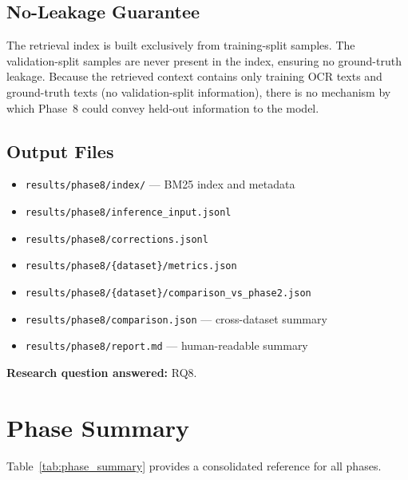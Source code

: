 \subsection{No-Leakage Guarantee}

The retrieval index is built exclusively from training-split samples. The
validation-split samples are never present in the index, ensuring no
ground-truth leakage. Because the retrieved context contains only training
OCR texts and ground-truth texts (no validation-split information), there is
no mechanism by which Phase~8 could convey held-out information to the model.

\subsection{Output Files}
\begin{itemize}
  \item \texttt{results/phase8/index/} --- BM25 index and metadata
  \item \texttt{results/phase8/inference\_input.jsonl}
  \item \texttt{results/phase8/corrections.jsonl}
  \item \texttt{results/phase8/\{dataset\}/metrics.json}
  \item \texttt{results/phase8/\{dataset\}/comparison\_vs\_phase2.json}
  \item \texttt{results/phase8/comparison.json} --- cross-dataset summary
  \item \texttt{results/phase8/report.md} --- human-readable summary
\end{itemize}

\noindent
\textbf{Research question answered:} RQ8.

\section{Phase Summary}
\label{sec:phase_summary}

Table~\ref{tab:phase_summary} provides a consolidated reference for all phases.

